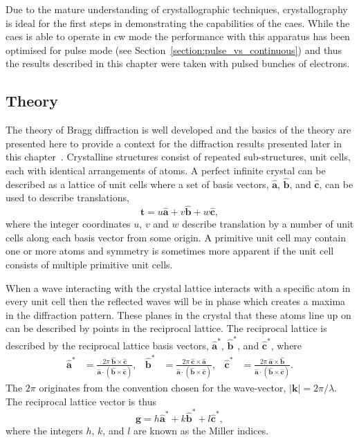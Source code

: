 Due to the mature understanding of crystallographic techniques, crystallography is ideal for the first steps in demonstrating the capabilities of the \gls{caes}.
While the \gls{caes} is able to operate in \gls{cw} mode the performance with this apparatus has been optimised for pulse mode (see Section~\ref{section:pulse_vs_continuous}) and thus the results described in this chapter were taken with pulsed bunches of electrons.

\subsection{Theory}

The theory of Bragg diffraction is well developed and the basics of the theory are presented here to provide a context for the diffraction results presented later in this chapter~\cite{kittel_introduction_2004}.
Crystalline structures consist of repeated sub-structures, unit cells, each with identical arrangements of atoms.
A perfect infinite crystal can be described as a lattice of unit cells where a set of basis vectors, $\mathbf{\hat{a}}$, $\mathbf{\hat{b}}$, and $\mathbf{\hat{c}}$, can be used to describe translations,
\begin{equation}
\mathbf{t} = u\mathbf{\hat{a}} + v\mathbf{\hat{b}} + w\mathbf{\hat{c}},
\end{equation}
where the integer coordinates $u$, $v$ and $w$ describe translation by a number of unit cells along each basis vector from some origin.
A primitive unit cell may contain one or more atoms and symmetry is sometimes more apparent if the unit cell consists of multiple primitive unit cells.

When a wave interacting with the crystal lattice interacts with a specific atom in every unit cell then the reflected waves will be in phase which creates a maxima in the diffraction pattern.
These planes in the crystal that these atoms line up on can be described by points in the reciprocal lattice.
The reciprocal lattice is described by the reciprocal lattice basis vectors, $\mathbf{\hat{a}^*}$, $\mathbf{\hat{b}^*}$, and $\mathbf{\hat{c}^*}$, where
\begin{align}
\mathbf{\hat{a}^*}&=\frac{2\pi\:\mathbf{\hat{b}}\times\mathbf{\hat{c}}}{\mathbf{\hat{a}}\cdot (\mathbf{\hat{b}} \times \mathbf{\hat{c}})},  &  \mathbf{\hat{b}^*}&=\frac{2\pi\:\mathbf{\hat{c}}\times\mathbf{\hat{a}}}{\mathbf{\hat{a}}\cdot (\mathbf{\hat{b}} \times \mathbf{\hat{c}})},  &  \mathbf{\hat{c}^*}&=\frac{2\pi\:\mathbf{\hat{a}}\times\mathbf{\hat{b}}}{\mathbf{\hat{a}}\cdot (\mathbf{\hat{b}} \times \mathbf{\hat{c}})}.
\end{align}
The $2\pi$ originates from the convention chosen for the wave-vector, $|\mathbf{k}|=2\pi/\lambda$. The reciprocal lattice vector is thus
\begin{equation}
\mathbf{g} = h\mathbf{\hat{a}^*} + k\mathbf{\hat{b}^*} + l\mathbf{\hat{c}^*},
\end{equation}
where the integers $h$, $k$, and $l$ are known as the Miller indices.

